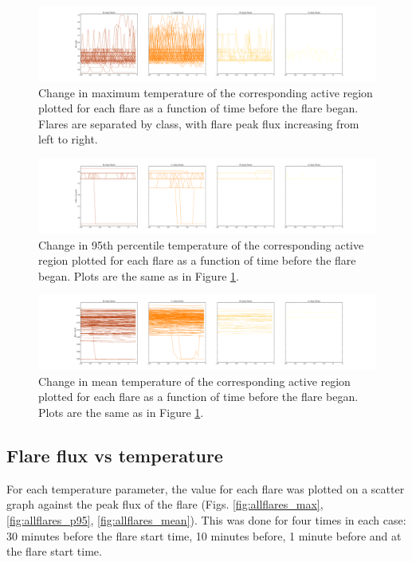 \documentclass[referee,a4paper,12pt]{swsc}
\begin{document}
\begin{linenumbers}
\begin{figure}
	\centering
		\includegraphics[width=\columnwidth]{tempplotsmax/allars.png}
	\caption{Change in maximum temperature of the corresponding active region plotted for each flare as a function of time before the flare began.
		Flares are separated by class, with flare peak flux increasing from left to right.}
	\label{fig:allars_max}
\end{figure}
\begin{figure}
	\centering
		\includegraphics[width=\columnwidth]{tempplots_p95/allars.png}
	\caption{Change in 95th percentile temperature of the corresponding active region plotted for each flare as a function of time before the flare began.
		Plots are the same as in Figure \ref{fig:allars_max}.}
	\label{fig:allars_p95}
\end{figure}
\begin{figure}
	\centering
		\includegraphics[width=\columnwidth]{tempplotsmean/allars.png}
	\caption{Change in mean temperature of the corresponding active region plotted for each flare as a function of time before the flare began.
		Plots are the same as in Figure \ref{fig:allars_max}.}
	\label{fig:allars_mean}
\end{figure}

\subsection{Flare flux vs temperature}
For each temperature parameter, the value for each flare was plotted on a scatter graph against the peak flux of the flare (Figs. \ref{fig:allflares_max}, \ref{fig:allflares_p95}, \ref{fig:allflares_mean}).
This was done for four times in each case: 30 minutes before the flare start time, 10 minutes before, 1 minute before and at the flare start time.


\end{linenumbers}
\end{document}

